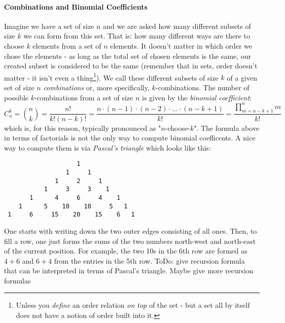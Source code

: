 


\paragraph{Combinations and Binomial Coefficients}
Imagine we have a set of size $n$ and we are asked how many different subsets of size $k$ we can form from this set. That is: how many different ways are there to choose $k$ elements from a set of $n$ elements. It doesn't matter in which order we chose the elements - as long as the total set of chosen elements is the same, our created subset is considered to be the same (remember that in sets, order doesn't matter - it isn't even a thing\footnote{Unless you \emph{define} an order relation \emph{on top} of the set - but a set all by itself does not have a notion of order built into it.}). We call these different subsets of size $k$ of a given set of size $n$ \emph{combinations} or, more specifically, $k$-combinations. The number of possible $k$-combinations from a set of size $n$ is given by the \emph{binomial coefficient}:
\begin{equation}
C_n^k = \binom{n}{k} 
      = \frac{n!}{k! (n-k)!} 
      = \frac{n \cdot (n-1) \cdot (n-2) \cdot \ldots \cdot (n-k+1)}{k!}
      = \frac{\prod_{m=n-k+1}^{n} m}{k!}
\end{equation}
which is, for this reason, typically pronounced as "$n$-choose-$k$". The formula above in terms of factorials is not the only way to compute binomial coefficents. A nice way to compute them is via \emph{Pascal's triangle} which looks like this:
\begin{center}  %
\begin{verbatim}
                    1
                 1     1
              1     2     1
           1     3     3    1
       1      4     6     4    1
    1      5    10    10     5   1
 1     6     15    20    15    6   1
\end{verbatim}
\end{center}
One starts with writing down the two outer edges consisting of all ones. Then, to fill a row, one  just forms the sums of the two numbers north-west and north-east of the current position. For example, the two 10s in the 6th row are formed as $4+6$ and $6+4$ from the entries in the 5th row.
ToDo: give recursion formula that can be interpreted in terms of Pascal's triangle. Maybe give more recursion formulas

